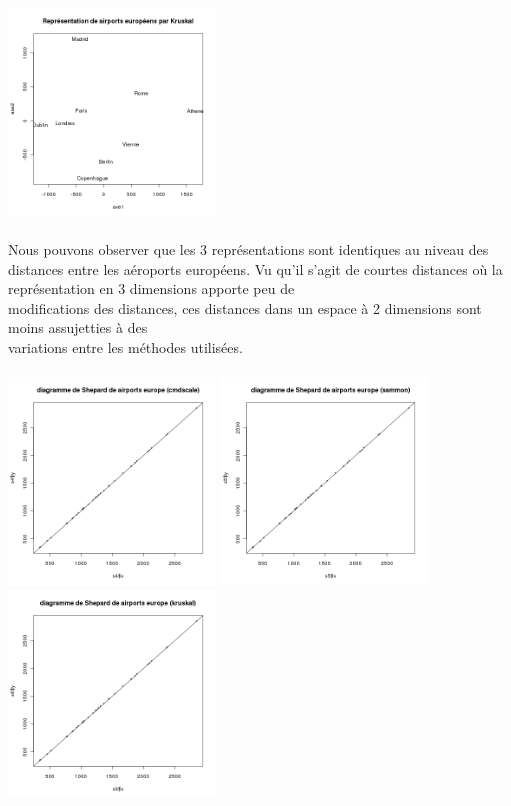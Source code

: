 \documentclass[a4paper, 10pt]{article}
\begin{document}
\includegraphics[height = 5.5cm, width = 5.5cm]{plots/plot_euro_kruskal.png}\\ \\
Nous pouvons observer que les 3 représentations sont identiques au niveau des distances entre les aéroports européens.
Vu qu'il s'agit de courtes distances où la représentation en 3 dimensions apporte peu de\\modifications des distances,
ces distances dans un espace à 2 dimensions sont moins assujetties à des\\variations entre les méthodes utilisées.\\ \\
\includegraphics[height = 5.5cm, width = 5.5cm]{plots/plot_euro_shepard_cmdscale.png}
\includegraphics[height = 5.5cm, width = 5.5cm]{plots/plot_euro_shepard_sammon.png}
\includegraphics[height = 5.5cm, width = 5.5cm]{plots/plot_euro_shepard_kruskal.png}\\ \\
\end{document}
